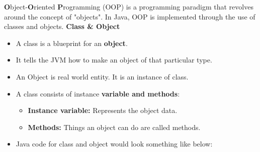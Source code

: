 

\begin{flushleft}
	
	\textbf{O}bject-\textbf{O}riented \textbf{P}rogramming (OOP) is a programming paradigm that revolves around the concept of "objects". 
	\newline
	\newline
	In Java, OOP is implemented through the use of classes and objects.
	\newline \newline
	\textbf{Class \& Object}	
	\begin{itemize}
		\item A class is a blueprint for an \textbf{object}. 
		\item It tells the JVM how to make an object of that particular type.
		\item An Object is real world entity. It is an instance of class.
		
		
		\item A class consists of instance \textbf{variable and methods}:
		\begin{itemize}
			\item \textbf{Instance variable:} Represents the object data.
			\item \textbf{Methods:} Things an object can do are called methods.
		\end{itemize}
		
		\newpage
		\item Java code for class and object would look something like below:
		
		
		
	\end{itemize}
	
\end{flushleft}
\newpage



